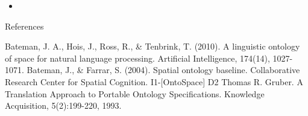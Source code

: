 \documentclass[12pt,a4paper]{beamer}
\begin{document}
\begin{frame}{}
\begin{itemize}
\item
\end{itemize}

\end{frame}









\begin{frame}[allowframebreaks]{References}
\begin{thebibliography}{-}
 Bateman, J. A., Hois, J., Ross, R., \& Tenbrink, T. (2010). A linguistic ontology of space for natural language processing. Artificial Intelligence, 174(14), 1027-1071.
 Bateman, J., \& Farrar, S. (2004). Spatial ontology baseline. Collaborative Research Center for Spatial Cognition. I1-[OntoSpace] D2
 Thomas R. Gruber. A Translation Approach to Portable Ontology Specifications. Knowledge Acquisition, 5(2):199-220, 1993.
\end{thebibliography}
\end{frame}
\end{document}
